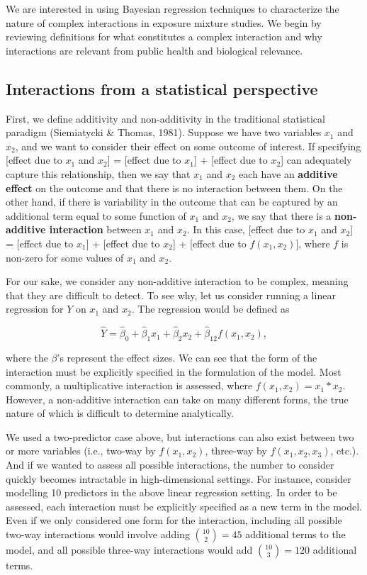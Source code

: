 \documentclass[12pt, twoside]{amherstthesis}
\begin{document}
We are interested in using Bayesian regression techniques to characterize the nature of complex interactions in exposure mixture studies. We begin by reviewing definitions for what constitutes a complex interaction and why interactions are relevant from public health and biological relevance.

\hypertarget{interactions-from-a-statistical-perspective}{%
\subsection{Interactions from a statistical perspective}\label{interactions-from-a-statistical-perspective}}

First, we define additivity and non-additivity in the traditional statistical paradigm (Siemiatycki \& Thomas, 1981). Suppose we have two variables \(x_1\) and \(x_2\), and we want to consider their effect on some outcome of interest. If specifying {[}effect due to \(x_1\) and \(x_2\){]} = {[}effect due to \(x_1\){]} + {[}effect due to \(x_2\){]} can adequately capture this relationship, then we say that \(x_1\) and \(x_2\) each have an \textbf{additive effect} on the outcome and that there is no interaction between them. On the other hand, if there is variability in the outcome that can be captured by an additional term equal to some function of \(x_1\) and \(x_2\), we say that there is a \textbf{non-additive interaction} between \(x_1\) and \(x_2\). In this case, {[}effect due to \(x_1\) and \(x_2\){]} = {[}effect due to \(x_1\){]} + {[}effect due to \(x_2\){]} + {[}effect due to \(f(x_1, x_2)\){]}, where \(f\) is non-zero for some values of \(x_1\) and \(x_2\).

For our sake, we consider any non-additive interaction to be complex, meaning that they are difficult to detect. To see why, let us consider running a linear regression for \(Y\) on \(x_1\) and \(x_2\). The regression would be defined as

\[
\widehat{Y} = \widehat\beta_0+\widehat\beta_1x_1+\widehat\beta_2x_2 + \widehat\beta_{12}f(x_1, x_2),
\]

\noindent where the \(\beta\)'s represent the effect sizes. We can see that the form of the interaction must be explicitly specified in the formulation of the model. Most commonly, a multiplicative interaction is assessed, where \(f(x_1, x_2) = x_1*x_2\). However, a non-additive interaction can take on many different forms, the true nature of which is difficult to determine analytically.

We used a two-predictor case above, but interactions can also exist between two or more variables (i.e., two-way by \(f(x_1, x_2)\), three-way by \(f(x_1, x_2, x_3)\), etc.). And if we wanted to assess all possible interactions, the number to consider quickly becomes intractable in high-dimensional settings. For instance, consider modelling 10 predictors in the above linear regression setting. In order to be assessed, each interaction must be explicitly specified as a new term in the model. Even if we only considered one form for the interaction, including all possible two-way interactions would involve adding \({10 \choose 2} = 45\) additional terms to the model, and all possible three-way interactions would add \({10 \choose 3} = 120\) additional terms.
\end{document}

